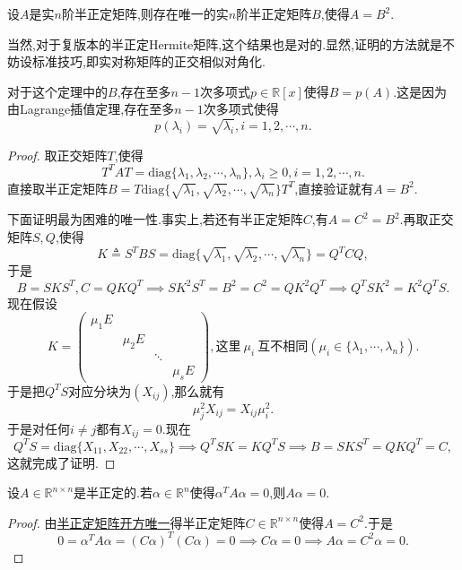 \documentclass[../../main.tex]{subfiles}
\begin{document}
\begin{theorem}[半正定矩阵开方唯一]\label{theorem:半正定矩阵开方唯一}
设\( A \)是实\( n \)阶半正定矩阵,则存在唯一的实\( n \)阶半正定矩阵\( B \),使得\( A = B^2 \).
\end{theorem}
\begin{note}
当然,对于复版本的半正定Hermite矩阵,这个结果也是对的.显然,证明的方法就是不妨设标准技巧,即实对称矩阵的正交相似对角化.
\end{note}
\begin{remark}
对于这个定理中的\( B \),存在至多\( n - 1 \)次多项式\( p \in \mathbb{R}[x] \)使得\( B = p(A) \).这是因为由Lagrange插值定理,存在至多\( n - 1 \)次多项式使得
\[
p(\lambda_i) = \sqrt{\lambda_i}, i = 1, 2, \cdots, n.
\]
\end{remark}
\begin{proof}
取正交矩阵\( T \),使得
\[
T^T A T = \text{diag}\{\lambda_1, \lambda_2, \cdots, \lambda_n\}, \lambda_i \geqslant  0, i = 1, 2, \cdots, n.
\]
直接取半正定矩阵\( B = T \text{diag}\{\sqrt{\lambda_1}, \sqrt{\lambda_2}, \cdots, \sqrt{\lambda_n}\} T^T \),直接验证就有\( A = B^2 \).

下面证明最为困难的唯一性.事实上,若还有半正定矩阵\( C \),有\( A = C^2 = B^2 \).再取正交矩阵\( S, Q \),使得
\[
K \triangleq S^T B S = \text{diag}\{\sqrt{\lambda_1}, \sqrt{\lambda_2}, \cdots, \sqrt{\lambda_n}\} = Q^T C Q,
\]
于是
\[
B = S K S^T, C = Q K Q^T \implies S K^2 S^T =B^2=C^2= Q K^2 Q^T \implies Q^T S K^2 = K^2 Q^T S.
\]
现在假设
\[
K = \begin{pmatrix}
\mu_1 E \\
& \mu_2 E \\
& & \ddots \\
& & & \mu_s E
\end{pmatrix}, \text{这里}\ \mu_i\ \text{互不相同}(\mu_i\in \{\lambda_1,\cdots,\lambda_n\}).
\]
于是把\( Q^T S \)对应分块为\( (X_{ij}) \),那么就有
\[
\mu_j^2 X_{ij} = X_{ij} \mu_i^2.
\]
于是对任何\( i \neq j \)都有\( X_{ij} = 0 \).现在
\[
Q^T S = \text{diag}\{X_{11}, X_{22}, \cdots, X_{ss}\} \implies Q^T S K = K Q^T S \implies B = S K S^T = Q K Q^T = C,
\]
这就完成了证明.
\end{proof}

\begin{proposition}\label{proposition:半正定矩阵开方唯一推论1}
设\( A \in \mathbb{R}^{n \times n} \)是半正定的.若\( \alpha \in \mathbb{R}^n \)使得\( \alpha^T A \alpha = 0 \),则\( A \alpha = 0 \).
\end{proposition}
\begin{proof}
由\hyperref[theorem:半正定矩阵开方唯一]{半正定矩阵开方唯一}得半正定矩阵\( C \in \mathbb{R}^{n \times n} \)使得\( A = C^2 \).于是
\[
0 = \alpha^T A \alpha = (C \alpha)^T (C \alpha) = 0 \implies C \alpha = 0 \implies A \alpha = C^2 \alpha = 0.
\]
\end{proof}
\end{document}
